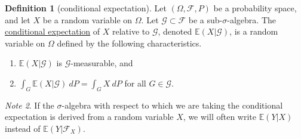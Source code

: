 \documentclass[a4paper,12pt]{scrreprt}
\newcommand{\defn}[1]{\ul{#1}}
\theoremstyle{definition}
\newtheorem{definition}{Definition}
\theoremstyle{plain}
\theoremstyle{remark}
\newtheorem{note}[definition]{Note}
\begin{document}
\begin{definition}[conditional expectation]
  \label{def:conditionalexpectation}
  Let $(\Omega, \mathcal{F}, P)$ be a probability space, and let $X$ be a random variable on $\Omega$. Let $\mathcal{G} \subset \mathcal{F}$ be a sub-$\sigma$-algebra. The \defn{conditional expectation} of $X$ relative to $\mathcal{G}$, denoted $\mathbb{E}(X | \mathcal{G})$, is a random variable on $\Omega$ defined by the following characteristics.
  \begin{enumerate}
    \item $\mathbb{E}(X | \mathcal{G})$ is $\mathcal{G}$-measurable, and

    \item $\int_{G} \mathbb{E}(X | \mathcal{G})\ dP = \int_{G} X\ dP$ for all $G \in \mathcal{G}$.
  \end{enumerate}
\end{definition}

\begin{note}
  If the $\sigma$-algebra with respect to which we are taking the conditional expectation is derived from a random variable $X$, we will often write $\mathbb{E}(Y|X)$ instead of $\mathbb{E}(Y|\mathcal{F}_{X})$.
\end{note}
\end{document}

